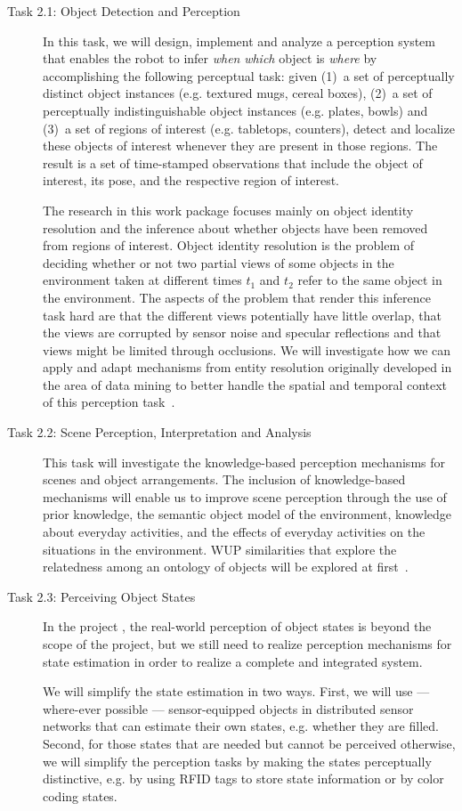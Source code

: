 \begin{description}
\item[Task 2.1: Object Detection and Perception] In this task, we will
  design, implement and analyze a perception system that enables
  the robot to infer \emph{when} \emph{which} object is \emph{where} by
  accomplishing the following perceptual task: given (1)~a set of
  perceptually distinct object instances (e.g. textured mugs, cereal boxes), 
  (2)~a set of perceptually indistinguishable object instances
  (e.g. plates, bowls) and (3)~a set of regions of interest (e.g. tabletops, counters),
  detect and localize these objects of interest whenever they are present in those regions.
  The result is a set of time-stamped observations that
  include the object of interest, its pose, and the respective region of
  interest.

  The research in this work package focuses mainly on object identity resolution 
  and the inference about whether objects have been removed from regions of interest.
  Object identity resolution is the problem of deciding whether or not two partial views
  of some objects in the environment taken at different times $t_1$ and
  $t_2$ refer to the same object in the environment. The aspects of the problem
  that render this inference task hard are that the different views potentially have
  little overlap, that the views are corrupted by sensor
  noise and specular reflections and that views might be limited
  through occlusions. We will investigate how we can apply and adapt
  mechanisms from entity resolution originally developed in the area of data
  mining to better handle the spatial and temporal context
  of this perception task~\cite{Blodow10Humanoids}.
\item[Task 2.2: Scene Perception, Interpretation and Analysis]
  This task will investigate the knowledge-based perception
  mechanisms for scenes and object arrangements. The inclusion of
  knowledge-based mechanisms will enable us to improve scene perception
  through the use of prior knowledge, the semantic object model of the
  environment, knowledge about everyday activities, and the effects of
  everyday activities on the situations in the environment. WUP similarities
  that explore the relatedness among an ontology of objects will be explored
  at first~\cite{wup}.
\item[Task 2.3: Perceiving Object States]
  In the project \ksem, the real-world perception of object states is
  beyond the scope of the project, but we still need to realize
  perception mechanisms for state estimation in order to realize a
  complete and integrated system.

  We will simplify the state estimation in two ways. First, we will use
  --- where-ever possible --- sensor-equipped objects in distributed sensor
  networks that can estimate their own states, e.g. whether they are
  filled.
  Second, for those states that are needed but cannot be perceived
  otherwise, we will simplify the perception tasks by making the states
  perceptually distinctive, e.g. by using RFID tags to store state
  information or by color coding states.
\end{description}

